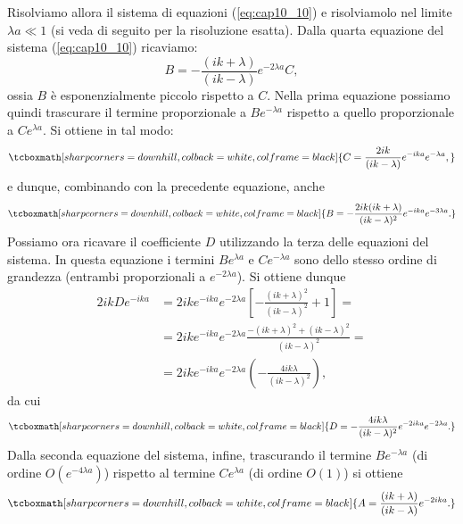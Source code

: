 \documentclass[a4paper,12pt,oneside]{book}
\begin{document}
Risolviamo allora il sistema di equazioni (\ref{eq:cap10_10}) e risolviamolo nel limite ${\lambda a \ll 1}$ (si veda di seguito per la risoluzione esatta). Dalla quarta equazione del sistema (\ref{eq:cap10_10}) ricaviamo:
	\begin{equation}
		B=-\frac{(ik+\lambda)}{(ik-\lambda)}e^{-2 \lambda a } C,
	\end{equation}
ossia $B$ è esponenzialmente piccolo rispetto a $C$.  Nella prima equazione possiamo quindi trascurare il termine proporzionale a $Be^{-\lambda a}$ rispetto a quello proporzionale a $Ce^{\lambda a }$. Si ottiene in tal modo:
	\begin{equation}
		\tcboxmath[sharp corners=downhill, colback=white, colframe=black]{
			C= \frac{2ik}{(ik-\lambda)}e^{-ika}e^{-\lambda a},
			}
	\end{equation}
e dunque, combinando con la precedente equazione, anche
	\begin{equation}
		\tcboxmath[sharp corners=downhill, colback=white, colframe=black]{
			B=-\frac{2ik(ik+\lambda)}{(ik-\lambda)^2}e^{-ik a }e^{-3 \lambda a }.
			}
	\end{equation}
Possiamo ora ricavare il coefficiente $D$ utilizzando la terza delle equazioni del sistema. In questa equazione i termini $Be^{\lambda a }$ e $Ce^{-\lambda a }$ sono dello stesso ordine di grandezza (entrambi proporzionali a $e^{-2\lambda a}$). Si ottiene dunque
	\begin{align}
		2ikDe^{-ika}&= 2ike^{-ika}e^{-2\lambda a} \left[-\frac{(ik+\lambda)^2}{(ik-\lambda)^2}+1\right]= \nonumber \\
		&= 2ike^{-ika}e^{-2\lambda a}\frac{-(ik+\lambda)^2+(ik-\lambda)^2}{(ik-\lambda)^2}= \nonumber \\
		&= 2ike^{-ika}e^{-2\lambda a}\left( -\frac{4ik\lambda}{(ik-\lambda)^2}\right),
	\end{align}
da cui
	\begin{equation}
		\tcboxmath[sharp corners=downhill, colback=white, colframe=black]{
			D= -\frac{4ik\lambda}{(ik-\lambda)^2}e^{-2ika}e^{-2\lambda a}.
			}
	\end{equation}
Dalla seconda equazione del sistema, infine, trascurando il termine $Be^{-\lambda a}$ (di ordine $O(e^{-4\lambda a })$) rispetto al termine $Ce^{\lambda a}$ (di ordine $O(1)$) si ottiene
	\begin{equation}
		\tcboxmath[sharp corners=downhill, colback=white, colframe=black]{
			A=\frac{(ik+\lambda)}{(ik-\lambda)}e^{-2ika}.
			}
	\end{equation}\\
	
\end{document}
